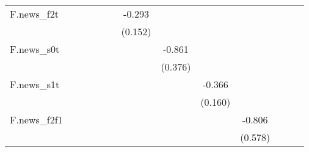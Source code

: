 {\begin{tabular}{l*{12}{c}}
\addlinespace
F.news\_f2t  &                     &                     &                     &                     &                     &      -0.293\sym{*}  &                     &                     &                     &                     &                     &                     \\
            &                     &                     &                     &                     &                     &     (0.152)         &                     &                     &                     &                     &                     &                     \\
\addlinespace
F.news\_s0t  &                     &                     &                     &                     &                     &                     &      -0.861\sym{**} &                     &                     &                     &                     &                     \\
            &                     &                     &                     &                     &                     &                     &     (0.376)         &                     &                     &                     &                     &                     \\
\addlinespace
F.news\_s1t  &                     &                     &                     &                     &                     &                     &                     &      -0.366\sym{**} &                     &                     &                     &                     \\
            &                     &                     &                     &                     &                     &                     &                     &     (0.160)         &                     &                     &                     &                     \\
\addlinespace
F.news\_f2f1 &                     &                     &                     &                     &                     &                     &                     &                     &      -0.806         &                     &                     &                     \\
            &                     &                     &                     &                     &                     &                     &                     &                     &     (0.578)         &                     &                     &                     \\

\end{tabular}}
